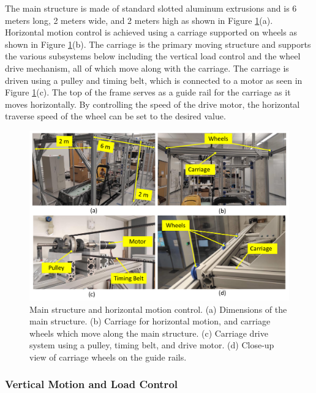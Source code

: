 \documentclass{article}
\begin{document}
The main structure is made of standard slotted aluminum extrusions and is 6 meters long, 2 meters wide, and 2 meters high as shown in Figure \ref{fig:carriage}(a).  Horizontal motion control is achieved using a carriage supported on wheels as shown in Figure \ref{fig:carriage}(b). The carriage is the primary moving structure and supports the various subsystems below including the vertical load control and the wheel drive mechanism, all of which move along with the carriage. The carriage is driven using a pulley and timing belt, which is connected to a motor as seen in Figure \ref{fig:carriage}(c). The top of the frame serves as a guide rail for the carriage as it moves horizontally. By controlling the speed of the drive motor, the horizontal traverse speed of the wheel can be set to the desired value.
\begin{figure}[hbt!]
\centering
\includegraphics[width=6.55in]{test-rig-images/carriage.pdf}
\caption{Main structure and horizontal motion control. (a) Dimensions of the main structure. (b) Carriage for horizontal motion, and carriage wheels which move along the main structure. (c) Carriage drive system using a pulley, timing belt, and drive motor. (d) Close-up view of carriage wheels on the guide rails. }
\label{fig:carriage}
\end{figure}





\subsubsection{Vertical Motion and Load Control}
\label{subsubsec:vertical-motion-control}
\end{document}
